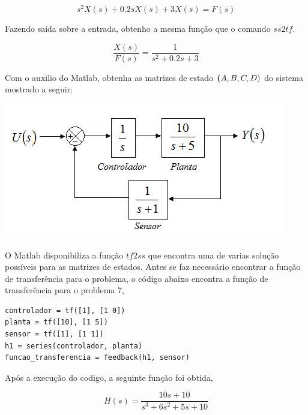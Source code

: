 \documentclass[a4paper, 10pt]{article}
\begin{document}
\begin{list}{\textbf{Questão .}}{
\setlength{\labelwidth}{-2mm} \setlength{\parsep}{0mm}
\setlength{\topsep}{0mm} \setlength{\leftmargin}{0mm}}
        $$
        s^2 X(s) + 0.2 s X(s) + 3 X(s) = F(s)
        $$
        
        Fazendo saída sobre a entrada, obtenho a mesma
        função que o comando $ss2tf$.
        
        \begin{equation}
        \frac{X(s)}{F(s)} = \frac{1}{s^2 + 0.2 s + 3}
        \end{equation}




\newpage
\item
    Com o auxilio do Matlab, obtenha as matrizes de estado $\textbf(A, B, C, D)$ do 
    sistema mostrado a seguir:
            \begin{center}
            \includegraphics[scale=0.6]{fig7.png}
            \end{center}

            O Matlab disponibiliza a função $tf2ss$ que encontra uma de varias 
            solução possíveis para as matrizes de estados. Antes se faz
            necessário encontrar a função de transferência para o problema, 
            o código abaixo encontra a função de transferência para o problema 7,

            \begin{lstlisting}
controlador = tf([1], [1 0])
planta = tf([10], [1 5])
sensor = tf([1], [1 1])
h1 = series(controlador, planta)
funcao_transferencia = feedback(h1, sensor)
                \end{lstlisting}

            Após a execução do codigo, a seguinte função foi obtida,

            $$
            H(s) = \frac{10 s + 10}{s^3 + 6 s^2 + 5 s + 10}
            $$


\end{list}
\end{document}
